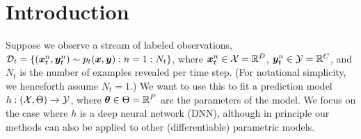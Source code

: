 

\section{Introduction}


Suppose we observe a stream of labeled observations,
${\mathcal{D}}_t=
\{({\bm{x}}_t^n, {\bm{y}}_t^n) \sim p_t({\bm{x}},{\bm{y}}): n=1:N_t\}$, where ${\bm{x}}_t^n \in \mathcal{X} = \mathbb{R}^D$,
${\bm{y}}_t^n \in \mathcal{Y} = \mathbb{R}^C$,
and $N_t$ is the number of examples revealed
per time step.
(For notational simplicity, we henceforth assume
$N_t=1$.)
We want to use this to fit a prediction model $h: (\mathcal{X}, \Theta) \rightarrow \mathcal{Y}$, where ${\bm{\theta}} \in \Theta = \mathbb{R}^P$ are the parameters of the model.
We focus on the case where $h$ is a deep neural network (DNN),
although in principle our methods can also be applied to other (differentiable) parametric models.

